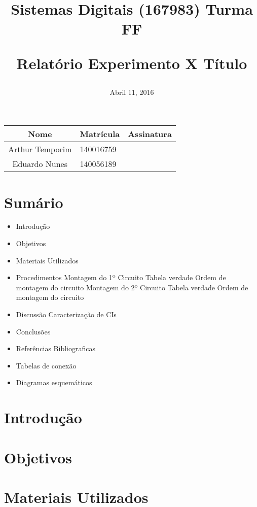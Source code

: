 \documentclass[12pts]{article}
\title{
	Sistemas Digitais (167983)
	\singlespace
	Turma FF
	\singlespacing
	\begin{midpage}
	\begin {large}
		Relatório Experimento X
		\singlespace
		Título
	\end {large}
	\end{midpage}
}
\date{Abril 11, 2016}
\begin{document}
\maketitle	
\begin{center}

\begin{tabular}{|c|l|r|}
\hline
Nome & Matrícula & Assinatura\\
\hline
Arthur Temporim & 140016759 & \\
\hline	
Eduardo Nunes & 140056189 & \\
\hline	
\end{tabular}

\end{center}


\newpage

\section{Sumário}

\begin{itemize}
\item Introdução
\item Objetivos
\item Materiais Utilizados
\item Procedimentos
\subitem Montagem do 1º Circuito
\subsubitem Tabela verdade
\subsubitem Ordem de montagem do circuito
\subitem Montagem do 2º Circuito
\subsubitem Tabela verdade
\subsubitem Ordem de montagem do circuito
\item Discussão
\subitem Caracterização de CIs
\item Conclusões 
\item Referências Bibliograficas
\item Tabelas de conexão
\item Diagramas esquemáticos
\end{itemize}

\newpage


\section{Introdução}

\singlespacing
\section{Objetivos}

\section{Materiais Utilizados}
\end{document}
